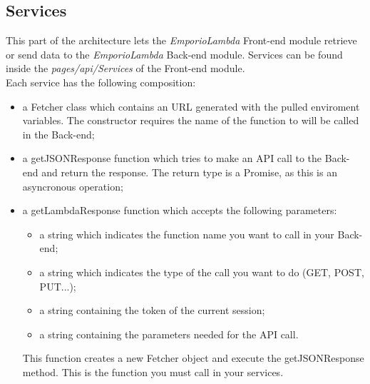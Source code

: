 \subsection{Services}
This part of the architecture lets the \textit{EmporioLambda} Front-end module retrieve or send data to the \textit{EmporioLambda} Back-end module. Services can be found inside the \textit{pages/api/Services} of the Front-end module.\\
Each service has the following composition:
\begin{itemize}
\item a Fetcher class which contains an URL generated with the pulled enviroment variables. The constructor requires the name of the function to will be called in the Back-end;
\item a getJSONResponse function which tries to make an API call to the Back-end and return the response. The return type is a Promise, as this is an asyncronous operation;
\item a getLambdaResponse function which accepts the following parameters:\begin{itemize}
\item a string which indicates the function name you want to call in your Back-end; 
\item a string which indicates the type of the call you want to do (GET, POST, PUT...);
\item a string containing the token of the current session; 
\item a string containing the parameters needed for the API call. 
\end{itemize} 
This function creates a new Fetcher object and execute the getJSONResponse method. This is the function you must call in your services.
\end{itemize}
